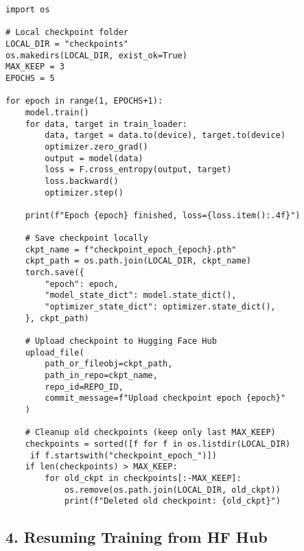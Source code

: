 \documentclass[a4paper, 12pt]{article}
\begin{document}
\begin{tcolorbox}[colback=yellow!5!white, colframe=yellow!75!black, title=Training with Auto-Save]
\begin{verbatim}
import os

# Local checkpoint folder
LOCAL_DIR = "checkpoints"
os.makedirs(LOCAL_DIR, exist_ok=True)
MAX_KEEP = 3
EPOCHS = 5

for epoch in range(1, EPOCHS+1):
    model.train()
    for data, target in train_loader:
        data, target = data.to(device), target.to(device)
        optimizer.zero_grad()
        output = model(data)
        loss = F.cross_entropy(output, target)
        loss.backward()
        optimizer.step()

    print(f"Epoch {epoch} finished, loss={loss.item():.4f}")

    # Save checkpoint locally
    ckpt_name = f"checkpoint_epoch_{epoch}.pth"
    ckpt_path = os.path.join(LOCAL_DIR, ckpt_name)
    torch.save({
        "epoch": epoch,
        "model_state_dict": model.state_dict(),
        "optimizer_state_dict": optimizer.state_dict(),
    }, ckpt_path)

    # Upload checkpoint to Hugging Face Hub
    upload_file(
        path_or_fileobj=ckpt_path,
        path_in_repo=ckpt_name,
        repo_id=REPO_ID,
        commit_message=f"Upload checkpoint epoch {epoch}"
    )

    # Cleanup old checkpoints (keep only last MAX_KEEP)
    checkpoints = sorted([f for f in os.listdir(LOCAL_DIR)
     if f.startswith("checkpoint_epoch_")])
    if len(checkpoints) > MAX_KEEP:
        for old_ckpt in checkpoints[:-MAX_KEEP]:
            os.remove(os.path.join(LOCAL_DIR, old_ckpt))
            print(f"Deleted old checkpoint: {old_ckpt}")
\end{verbatim}
\end{tcolorbox}



\subsection*{4. Resuming Training from HF Hub}
\end{document}
